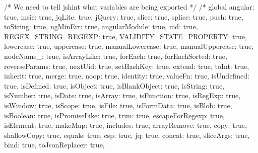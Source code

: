 \begin{DoxyCodeInclude}
\textcolor{comment}{/* We need to tell jshint what variables are being exported */}
\textcolor{comment}{/* global angular: true,}
\textcolor{comment}{  msie: true,}
\textcolor{comment}{  jqLite: true,}
\textcolor{comment}{  jQuery: true,}
\textcolor{comment}{  slice: true,}
\textcolor{comment}{  splice: true,}
\textcolor{comment}{  push: true,}
\textcolor{comment}{  toString: true,}
\textcolor{comment}{  ngMinErr: true,}
\textcolor{comment}{  angularModule: true,}
\textcolor{comment}{  uid: true,}
\textcolor{comment}{  REGEX\_STRING\_REGEXP: true,}
\textcolor{comment}{  VALIDITY\_STATE\_PROPERTY: true,}
\textcolor{comment}{}
\textcolor{comment}{  lowercase: true,}
\textcolor{comment}{  uppercase: true,}
\textcolor{comment}{  manualLowercase: true,}
\textcolor{comment}{  manualUppercase: true,}
\textcolor{comment}{  nodeName\_: true,}
\textcolor{comment}{  isArrayLike: true,}
\textcolor{comment}{  forEach: true,}
\textcolor{comment}{  forEachSorted: true,}
\textcolor{comment}{  reverseParams: true,}
\textcolor{comment}{  nextUid: true,}
\textcolor{comment}{  setHashKey: true,}
\textcolor{comment}{  extend: true,}
\textcolor{comment}{  toInt: true,}
\textcolor{comment}{  inherit: true,}
\textcolor{comment}{  merge: true,}
\textcolor{comment}{  noop: true,}
\textcolor{comment}{  identity: true,}
\textcolor{comment}{  valueFn: true,}
\textcolor{comment}{  isUndefined: true,}
\textcolor{comment}{  isDefined: true,}
\textcolor{comment}{  isObject: true,}
\textcolor{comment}{  isBlankObject: true,}
\textcolor{comment}{  isString: true,}
\textcolor{comment}{  isNumber: true,}
\textcolor{comment}{  isDate: true,}
\textcolor{comment}{  isArray: true,}
\textcolor{comment}{  isFunction: true,}
\textcolor{comment}{  isRegExp: true,}
\textcolor{comment}{  isWindow: true,}
\textcolor{comment}{  isScope: true,}
\textcolor{comment}{  isFile: true,}
\textcolor{comment}{  isFormData: true,}
\textcolor{comment}{  isBlob: true,}
\textcolor{comment}{  isBoolean: true,}
\textcolor{comment}{  isPromiseLike: true,}
\textcolor{comment}{  trim: true,}
\textcolor{comment}{  escapeForRegexp: true,}
\textcolor{comment}{  isElement: true,}
\textcolor{comment}{  makeMap: true,}
\textcolor{comment}{  includes: true,}
\textcolor{comment}{  arrayRemove: true,}
\textcolor{comment}{  copy: true,}
\textcolor{comment}{  shallowCopy: true,}
\textcolor{comment}{  equals: true,}
\textcolor{comment}{  csp: true,}
\textcolor{comment}{  jq: true,}
\textcolor{comment}{  concat: true,}
\textcolor{comment}{  sliceArgs: true,}
\textcolor{comment}{  bind: true,}
\textcolor{comment}{  toJsonReplacer: true,}

\end{DoxyCodeInclude}
